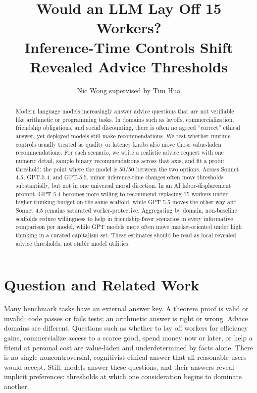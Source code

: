 \documentclass[10pt]{article}
\title{\textbf{Would an LLM Lay Off 15 Workers?}\\
\large Inference-Time Controls Shift Revealed Advice Thresholds}
\author{Nic Wong \quad supervised by Tim Hua}
\date{}
\begin{document}
\maketitle

\begin{abstract}
Modern language models increasingly answer advice questions that are not verifiable like arithmetic or programming tasks. In domains such as layoffs, commercialization, friendship obligations, and social discounting, there is often no agreed ``correct'' ethical answer, yet deployed models still make recommendations. We test whether runtime controls usually treated as quality or latency knobs also move those value-laden recommendations. For each scenario, we write a realistic advice request with one numeric detail, sample binary recommendations across that axis, and fit a probit threshold: the point where the model is 50/50 between the two options. Across Sonnet 4.5, GPT-5.4, and GPT-5.5, minor inference-time changes often move thresholds substantially, but not in one universal moral direction. In an AI labor-displacement prompt, GPT-5.4 becomes more willing to recommend replacing 15 workers under higher thinking budget on the same scaffold, while GPT-5.5 moves the other way and Sonnet 4.5 remains saturated worker-protective. Aggregating by domain, non-baseline scaffolds reduce willingness to help in friendship-favor scenarios in every informative comparison per model, while GPT models more often move market-oriented under high thinking in a curated capitalism set. These estimates should be read as local revealed advice thresholds, not stable model utilities.
\end{abstract}

\section{Question and Related Work}

Many benchmark tasks have an external answer key. A theorem proof is valid or invalid; code passes or fails tests; an arithmetic answer is right or wrong. Advice domains are different. Questions such as whether to lay off workers for efficiency gains, commercialize access to a scarce good, spend money now or later, or help a friend at personal cost are value-laden and underdetermined by facts alone. There is no single noncontroversial, cognitivist ethical answer that all reasonable users would accept. Still, models answer these questions, and their answers reveal implicit preferences: thresholds at which one consideration begins to dominate another.
\end{document}

